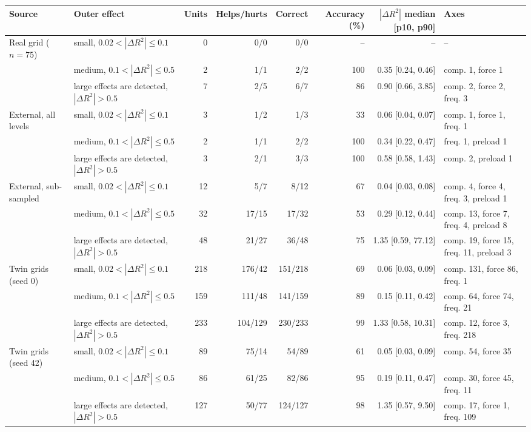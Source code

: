 \begin{tabular}{l l r r r r r l}
\toprule
Source & Outer effect & Units & Helps/hurts & Correct & Accuracy (\%) & $|\Delta R^2|$ median [p10, p90] & Axes \\
\midrule
Real grid ($n=75$) & small, $0.02 < |\Delta R^2| \le 0.1$ & 0 & 0/0 & 0/0 & -- & -- & -- \\
 & medium, $0.1 < |\Delta R^2| \le 0.5$ & 2 & 1/1 & 2/2 & 100 & 0.35 [0.24, 0.46] & comp. 1, force 1 \\
 & large effects are detected, $|\Delta R^2| > 0.5$ & 7 & 2/5 & 6/7 & 86 & 0.90 [0.66, 3.85] & comp. 2, force 2, freq. 3 \\
\addlinespace
External, all levels & small, $0.02 < |\Delta R^2| \le 0.1$ & 3 & 1/2 & 1/3 & 33 & 0.06 [0.04, 0.07] & comp. 1, force 1, freq. 1 \\
 & medium, $0.1 < |\Delta R^2| \le 0.5$ & 2 & 1/1 & 2/2 & 100 & 0.34 [0.22, 0.47] & freq. 1, preload 1 \\
 & large effects are detected, $|\Delta R^2| > 0.5$ & 3 & 2/1 & 3/3 & 100 & 0.58 [0.58, 1.43] & comp. 2, preload 1 \\
\addlinespace
External, sub-sampled & small, $0.02 < |\Delta R^2| \le 0.1$ & 12 & 5/7 & 8/12 & 67 & 0.04 [0.03, 0.08] & comp. 4, force 4, freq. 3, preload 1 \\
 & medium, $0.1 < |\Delta R^2| \le 0.5$ & 32 & 17/15 & 17/32 & 53 & 0.29 [0.12, 0.44] & comp. 13, force 7, freq. 4, preload 8 \\
 & large effects are detected, $|\Delta R^2| > 0.5$ & 48 & 21/27 & 36/48 & 75 & 1.35 [0.59, 77.12] & comp. 19, force 15, freq. 11, preload 3 \\
\addlinespace
Twin grids (seed 0) & small, $0.02 < |\Delta R^2| \le 0.1$ & 218 & 176/42 & 151/218 & 69 & 0.06 [0.03, 0.09] & comp. 131, force 86, freq. 1 \\
 & medium, $0.1 < |\Delta R^2| \le 0.5$ & 159 & 111/48 & 141/159 & 89 & 0.15 [0.11, 0.42] & comp. 64, force 74, freq. 21 \\
 & large effects are detected, $|\Delta R^2| > 0.5$ & 233 & 104/129 & 230/233 & 99 & 1.33 [0.58, 10.31] & comp. 12, force 3, freq. 218 \\
\addlinespace
Twin grids (seed 42) & small, $0.02 < |\Delta R^2| \le 0.1$ & 89 & 75/14 & 54/89 & 61 & 0.05 [0.03, 0.09] & comp. 54, force 35 \\
 & medium, $0.1 < |\Delta R^2| \le 0.5$ & 86 & 61/25 & 82/86 & 95 & 0.19 [0.11, 0.47] & comp. 30, force 45, freq. 11 \\
 & large effects are detected, $|\Delta R^2| > 0.5$ & 127 & 50/77 & 124/127 & 98 & 1.35 [0.57, 9.50] & comp. 17, force 1, freq. 109 \\
\bottomrule
\end{tabular}
